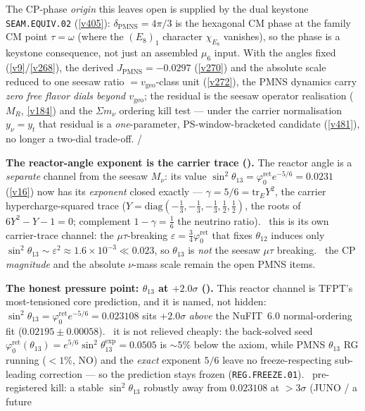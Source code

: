 \documentclass[11pt,a4paper]{article}
\newcommand{\phiz}{\varphi_0^{\mathrm{ret}}}
\theoremstyle{definition}
\begin{document}
The CP-phase \emph{origin} this leaves open is supplied by the dual keystone \texttt{SEAM.EQUIV.02} (\vref{v405}):
$\delta_{\mathrm{PMNS}}=4\pi/3$ is the hexagonal CM phase at the family CM point $\tau{=}\omega$ (where the
$(E_8)_1$ character $\chi_{E_8}$ vanishes), so the phase is a keystone consequence, not just an assembled
$\mu_6$ input. With the angles fixed (\vref{v9}/\vref{v268}), the derived $J_{\mathrm{PMNS}}=-0.0297$
(\vref{v270}) and the absolute scale reduced to one seesaw ratio $=v_{\mathrm{geo}}$-class unit (\vref{v272}),
the PMNS dynamics carry \emph{zero free flavor dials beyond $v_{\mathrm{geo}}$}; the residual is the seesaw
operator realisation ($M_R$, \vref{v184}) and the $\Sigma m_\nu$ ordering kill test --- under the carrier
normalisation $y_\nu{=}y_t$ that residual is a \emph{one}-parameter, PS-window-bracketed candidate
(\vref{v481}), no longer a two-dial trade-off. \mE/\mC
\par\smallskip\noindent\textbf{The reactor-angle exponent is the carrier trace ().}
The reactor angle is a \emph{separate} channel from the seesaw $M_\nu$: its value $\sin^2\theta_{13}=\phiz
e^{-5/6}=0.0231$ (\vref{v16}) now has its \emph{exponent} closed exactly --- $\gamma=5/6=\mathrm{tr}_E Y^2$,
the carrier hypercharge-squared trace ($Y=\mathrm{diag}(-\tfrac13,-\tfrac13,-\tfrac13,\tfrac12,\tfrac12)$,
the roots of $6Y^2-Y-1=0$; complement $1-\gamma=\tfrac16$ the neutrino ratio). \mE\ this is its own
carrier-trace channel: the $\mu\tau$-breaking $\varepsilon=\tfrac34\phiz$ that fixes $\theta_{12}$ induces
only $\sin^2\theta_{13}\sim\varepsilon^2\approx1.6\times10^{-3}\ll0.023$, so $\theta_{13}$ is \emph{not} the
seesaw $\mu\tau$ breaking. \mO\ the CP \emph{magnitude} and the absolute $\nu$-mass scale remain the open
PMNS items.
\par\smallskip\noindent\textbf{The honest pressure point: $\theta_{13}$ at $+2.0\sigma$ ().}
This reactor channel is TFPT's most-tensioned core prediction, and it is named, not hidden: $\sin^2\theta_{13}=\phiz
e^{-5/6}=0.023108$ sits $+2.0\sigma$ \emph{above} the NuFIT~6.0 normal-ordering fit ($0.02195\pm0.00058$). \mC\ it is
not relieved cheaply: the back-solved seed $\phiz(\theta_{13})=e^{5/6}\sin^2\theta_{13}^{\mathrm{exp}}=0.0505$ is
${\sim}5\%$ below the axiom, while PMNS $\theta_{13}$ RG running ($<1\%$, NO) and the \emph{exact} exponent $5/6$
leave no freeze-respecting sub-leading correction --- so the prediction stays frozen (\texttt{REG.FREEZE.01}).
\mX\ pre-registered kill: a stable $\sin^2\theta_{13}$ robustly away from $0.023108$ at $>3\sigma$ (JUNO / a future
\end{document}
